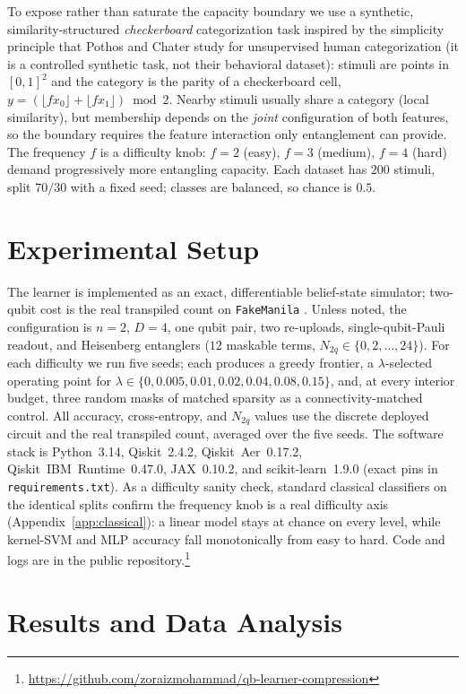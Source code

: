 \documentclass[conference]{IEEEtran}
\begin{document}
To expose rather than saturate the capacity boundary we use a synthetic,
similarity-structured \emph{checkerboard} categorization task inspired by the simplicity
principle that Pothos and Chater study for unsupervised human categorization \cite{b19}
(it is a controlled synthetic task, not their behavioral dataset): stimuli are points in
$[0,1]^2$ and the category is the parity of a checkerboard cell,
$y=(\lfloor f x_0\rfloor + \lfloor f x_1\rfloor)\bmod 2$. Nearby
stimuli usually share a category (local similarity), but membership depends on the
\emph{joint} configuration of both features, so the boundary requires the feature
interaction only entanglement can provide. The frequency $f$ is a difficulty knob: $f=2$
(easy), $f=3$ (medium), $f=4$ (hard) demand progressively more entangling capacity. Each
dataset has $200$ stimuli, split $70/30$ with a fixed seed; classes are balanced, so
chance is $0.5$.

\section{Experimental Setup}

The learner is implemented as an exact, differentiable belief-state simulator; two-qubit
cost is the real transpiled count on \texttt{FakeManila} \cite{b24}. Unless noted, the
configuration is $n=2$, $D=4$, one qubit pair, two re-uploads, single-qubit-Pauli readout,
and Heisenberg entanglers ($12$ maskable terms, $N_{2q}\in\{0,2,\dots,24\}$). For each
difficulty we run five seeds; each produces a greedy frontier, a $\lambda$-selected
operating point for $\lambda\in\{0,0.005,0.01,0.02,0.04,0.08,0.15\}$, and, at every
interior budget, three random masks of matched sparsity as a connectivity-matched control.
All accuracy, cross-entropy, and $N_{2q}$ values use the discrete deployed circuit and the
real transpiled count, averaged over the five seeds. The software stack is Python~3.14,
Qiskit~2.4.2, Qiskit~Aer~0.17.2, Qiskit~IBM~Runtime~0.47.0, JAX~0.10.2, and
scikit-learn~1.9.0 (exact pins in \texttt{requirements.txt}). As a difficulty sanity
check, standard classical classifiers on the identical splits confirm the frequency knob
is a real difficulty axis (Appendix~\ref{app:classical}): a linear model stays at chance
on every level, while kernel-SVM and MLP accuracy fall monotonically from easy to hard.
Code and logs are in the public
repository.\footnote{\url{https://github.com/zoraizmohammad/qb-learner-compression}}

\section{Results and Data Analysis}
\label{sec:results}
\end{document}
